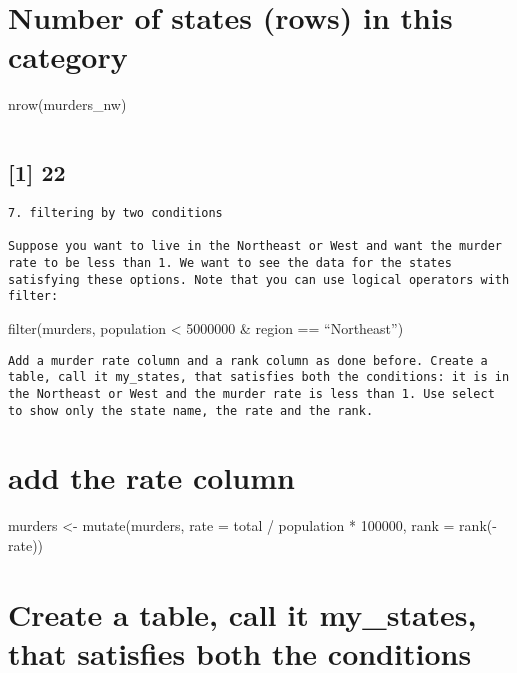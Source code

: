 \documentclass[
]{article}
\begin{document}
\hypertarget{number-of-states-rows-in-this-category}{%
\section{Number of states (rows) in this
category}\label{number-of-states-rows-in-this-category}}

nrow(murders\_nw)

\begin{verbatim}
\end{verbatim}

\hypertarget{section-2}{%
\subsection{{[}1{]} 22}\label{section-2}}

\begin{verbatim}
7. filtering by two conditions

Suppose you want to live in the Northeast or West and want the murder rate to be less than 1. We want to see the data for the states satisfying these options. Note that you can use logical operators with filter:
\end{verbatim}

filter(murders, population \textless{} 5000000 \& region ==
``Northeast'')

\begin{verbatim}
Add a murder rate column and a rank column as done before. Create a table, call it my_states, that satisfies both the conditions: it is in the Northeast or West and the murder rate is less than 1. Use select to show only the state name, the rate and the rank.
\end{verbatim}

\hypertarget{add-the-rate-column}{%
\section{add the rate column}\label{add-the-rate-column}}

murders \textless- mutate(murders, rate = total / population * 100000,
rank = rank(-rate))

\hypertarget{create-a-table-call-it-my_states-that-satisfies-both-the-conditions}{%
\section{Create a table, call it my\_states, that satisfies both the
conditions}\label{create-a-table-call-it-my_states-that-satisfies-both-the-conditions}}
\end{document}
